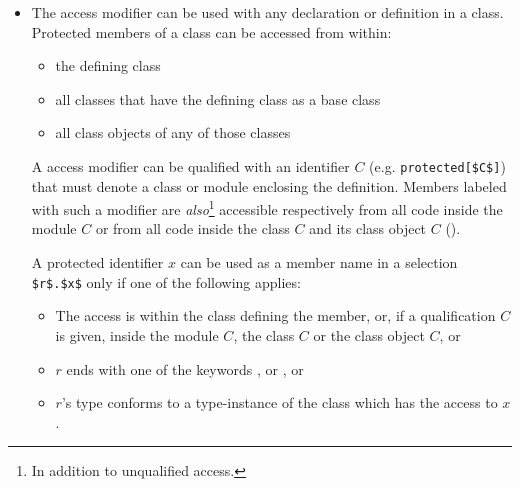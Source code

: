 \begin{itemize}
  Class-private and object-private members must not be , since there is no way to provide a concrete implementation for them, as private members are not inherited. Moreover, modifiers  \&  can not be applied to them (that would be a contradiction\footnote{E.g., a member can not be public and private at the same time.}), and the modifier  can not be applied to them as well\footnote{Otherwise, if a private member could override an inherited member, that would mean there is an inherited member that could be overridden, but private members can not override anything: only protected and public members can be overridden. If a member was overriding an inherited member, the parent class would {\em lose access} to it.}. 

  \item The  access modifier can be used with any declaration or definition in a class. Protected members of a class can be accessed from within: 
  \begin{itemize}
    \item the defining class
    \item all classes that have the defining class as a base class
    \item all class objects of any of those classes
  \end{itemize}

  A  access modifier can be qualified with an identifier $C$ (e.g. \lstinline!protected[$C$]!) that must denote a class or module enclosing the definition. Members labeled with such a modifier are {\em also}\footnote{In addition to unqualified  access.} accessible respectively from all code inside the module $C$ or from all code inside the class $C$ and its class object $C$ (). 

  A protected identifier $x$ can be used as a member name in a selection \lstinline!$r$.$x$! only if one of the following applies: 
  \begin{itemize}
    \item The access is within the class defining the member, or, if a qualification $C$ is given, inside the module $C$, the class $C$ or the class object $C$, or
    \item $r$ ends with one of the keywords ,  or , or
    \item $r$'s type conforms to a type-instance of the class which has the access to $x$. 
  \end{itemize}


\end{itemize}

